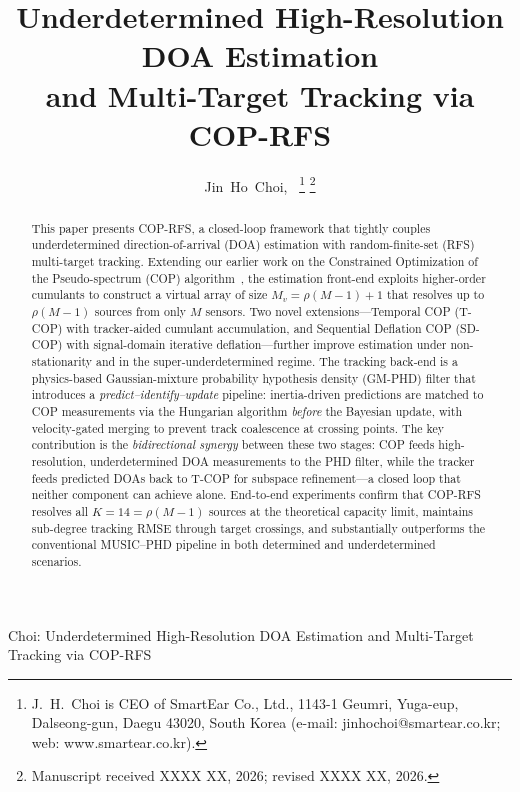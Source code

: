 \documentclass[journal]{IEEEtran}
\begin{document}
\title{Underdetermined High-Resolution DOA Estimation\\and Multi-Target Tracking via COP-RFS}

\author{Jin~Ho~Choi,~
\thanks{J.~H.~Choi is CEO of SmartEar Co., Ltd., 1143-1 Geumri, Yuga-eup, Dalseong-gun, Daegu 43020, South Korea (e-mail: jinhochoi@smartear.co.kr; web: www.smartear.co.kr).}
\thanks{Manuscript received XXXX XX, 2026; revised XXXX XX, 2026.}}

{Choi: Underdetermined High-Resolution DOA Estimation and Multi-Target Tracking via COP-RFS}

\maketitle

\begin{abstract}
This paper presents COP-RFS, a closed-loop framework that tightly couples underdetermined direction-of-arrival (DOA) estimation with random-finite-set (RFS) multi-target tracking. Extending our earlier work on the Constrained Optimization of the Pseudo-spectrum (COP) algorithm~\cite{choi2015underdetermined}, the estimation front-end exploits higher-order cumulants to construct a virtual array of size $M_v=\rho(M{-}1){+}1$ that resolves up to $\rho(M{-}1)$ sources from only $M$ sensors. Two novel extensions---Temporal COP (T-COP) with tracker-aided cumulant accumulation, and Sequential Deflation COP (SD-COP) with signal-domain iterative deflation---further improve estimation under non-stationarity and in the super-underdetermined regime. The tracking back-end is a physics-based Gaussian-mixture probability hypothesis density (GM-PHD) filter that introduces a \emph{predict--identify--update} pipeline: inertia-driven predictions are matched to COP measurements via the Hungarian algorithm \emph{before} the Bayesian update, with velocity-gated merging to prevent track coalescence at crossing points. The key contribution is the \emph{bidirectional synergy} between these two stages: COP feeds high-resolution, underdetermined DOA measurements to the PHD filter, while the tracker feeds predicted DOAs back to T-COP for subspace refinement---a closed loop that neither component can achieve alone. End-to-end experiments confirm that COP-RFS resolves all $K{=}14{=}\rho(M{-}1)$ sources at the theoretical capacity limit, maintains sub-degree tracking RMSE through target crossings, and substantially outperforms the conventional MUSIC--PHD pipeline in both determined and underdetermined scenarios.
\end{abstract}
\end{document}
